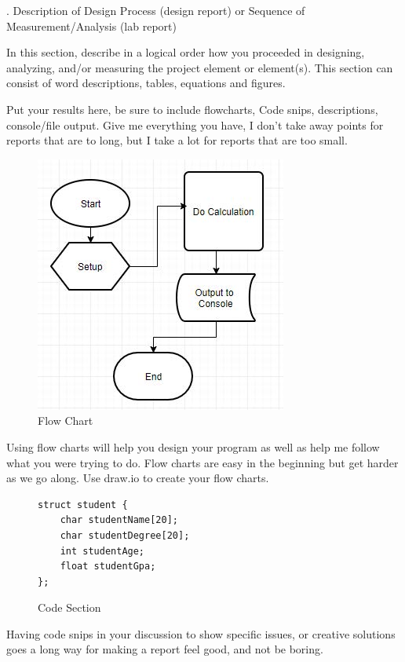 \documentclass[11pt]{ECEtemp}
\begin{document}
. Description of Design Process (design report) or Sequence of Measurement/Analysis (lab report)

In this section, describe in a logical order how you proceeded in designing, analyzing, and/or measuring the project element or element(s). This section can consist of word descriptions, tables, equations and figures.


Put your results here, be sure to include flowcharts, Code snips, descriptions, console/file output. Give me everything you have, I don't take away points for reports that are to long, but I take a lot for reports that are too small.

\begin{figure}[!htb]
    \centering
    \includegraphics[scale=1]{img/fig_flowchart.jpg}
    \caption{Flow Chart}
    \label{fig_figure_1}
\end{figure}

Using flow charts will help you design your program as well as help me follow what you were trying to do. Flow charts are easy in the beginning but get harder as we go along. Use draw.io to create your flow charts.

\begin{figure}[!htb]
    \centering
\begin{lstlisting}
struct student {
    char studentName[20];
    char studentDegree[20];
    int studentAge;
    float studentGpa;
};
\end{lstlisting}
    \caption{Code Section}
    \label{code_snip1}
\end{figure}

Having code snips in your discussion to show specific issues, or creative solutions goes a long way for making a report feel good, and not be boring.
\end{document}
